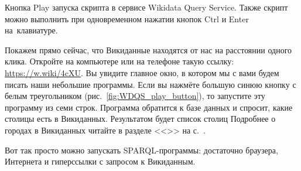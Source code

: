 \begin{marginfigure}[0.0cm]
{
\setlength{\fboxsep}{0pt}%
\setlength{\fboxrule}{1pt}%
}
\caption[Выполнение скрипта в сервисе Wikidata Query Service.]{Кнопка Play запуска скрипта в сервисе Wikidata Query Service. Также скрипт можно выполнить при одновременном нажатии кнопок Ctrl и Enter на~клавиатуре.}%
\label{fig:WDQS_play_button}%
\end{marginfigure}%
Покажем прямо сейчас, что Викиданные находятся от нас на расстоянии одного клика.
Откройте на компьютере или на телефоне такую ссылку: 
\url{https://w.wiki/4cXU}. 
Вы увидите главное окно, в котором мы с вами будем писать наши небольшие программы. 
Если вы нажмёте большую синюю кнопку с белым треугольником (рис.~\ref{fig:WDQS_play_button}), 
то запустите эту программу из семи строк. 
Программа обратится к базе данных 
и спросит, какие столицы есть в Викиданных. Результатом будет список столиц %
%
Подробнее о городах в Викиданных читайте в разделе <<>> на с.~\pageref{ch:city}. 

Вот так просто можно запускать SPARQL-программы: достаточно браузера, 
Интернета и гиперссылки с запросом к Викиданным.



